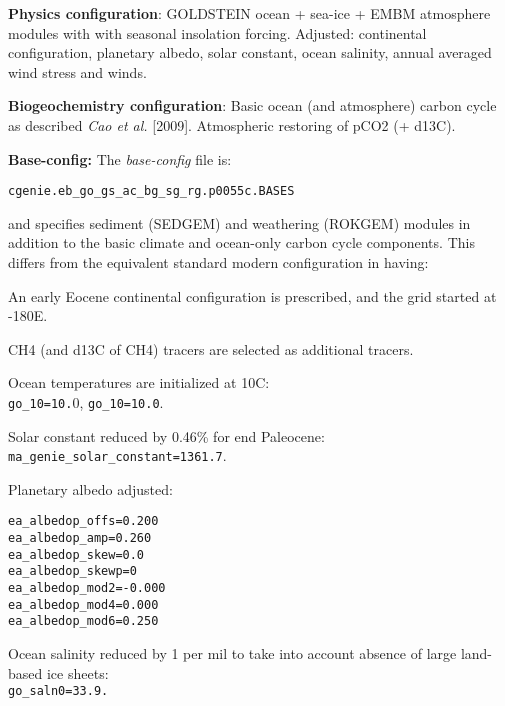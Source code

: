 \documentclass[10pt,twoside]{article}
\begin{document}
\noindent \textbf{Physics configuration}: GOLDSTEIN ocean + sea-ice + EMBM atmosphere modules with with seasonal insolation forcing. Adjusted: continental configuration, planetary albedo, solar constant, ocean salinity, annual averaged wind stress and winds.

\noindent \textbf{Biogeochemistry configuration}: Basic ocean (and atmosphere) carbon cycle as described \textit{Cao et al.} [2009]. Atmospheric restoring of pCO2 (+ d13C).

\noindent \textbf{Base-config:} The \textit{base-config} file is:
\vspace{-10pt}\begin{verbatim}cgenie.eb_go_gs_ac_bg_sg_rg.p0055c.BASES\end{verbatim}\vspace{-10pt}
and specifies sediment (SEDGEM) and weathering (ROKGEM) modules in addition to the basic climate and ocean-only carbon cycle components.
This differs from the equivalent standard modern configuration in having:
        \begin{compactitem}
        \item An early Eocene continental configuration is prescribed, and the grid started at -180E.
                \item CH4 (and d13C of CH4) tracers are selected as additional tracers. 
                \item Ocean temperatures are initialized at 10C:
                \\ \texttt{go\_10=10.}0, \texttt{go\_10=10.0}.
                \item Solar constant reduced by 0.46\% for end Paleocene:
                \\ \texttt{ma\_genie\_solar\_constant=1361.7}.
                \item Planetary albedo adjusted:
                \vspace{-5pt}\begin{verbatim}
ea_albedop_offs=0.200
ea_albedop_amp=0.260
ea_albedop_skew=0.0
ea_albedop_skewp=0
ea_albedop_mod2=-0.000
ea_albedop_mod4=0.000
ea_albedop_mod6=0.250
\end{verbatim}\vspace{-5pt}
\item Ocean salinity reduced by 1 per mil to take into account absence of large land-based ice sheets:
\\ \texttt{go\_saln0=33.9.}
        \end{compactitem}
\end{document}
